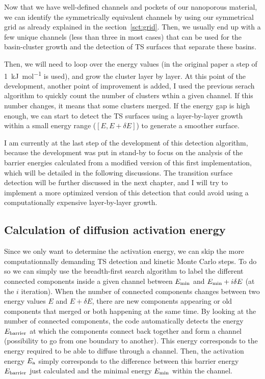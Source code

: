 \documentclass[main]{subfiles}
\begin{document}
Now that we have well-defined channels and pockets of our nanoporous material, we can identify the symmetrically equivalent channels by using our symmetrical grid as already explained in the section~\ref{sct:grid}. Then, we usually end up with a few unique channels (less than three in most cases) that can be used for the basin-cluster growth and the detection of TS surfaces that separate these basins. 

Then, we will need to loop over the energy values (in the original paper a step of \SI{1}{\kJ\per\mole} is used), and grow the cluster layer by layer. At this point of the development, another point of improvement is added, I used the previous serach algorithm to quickly count the number of clusters wthin a given channel. If this number changes, it means that some clusters merged. If the energy gap is high enough, we can start to detect the TS surfaces using a layer-by-layer growth within a small energy range ($[E,E+\delta E]$) to generate a smoother surface. 

I am currently at the last step of the development of this detection algorithm, because the development was put in stand-by to focus on the analysis of the barrier energies calculated from a modified version of this first implementation, which will be detailed in the following discussions. The transition surface detection will be further discussed in the next chapter, and I will try to implement a more optimized version of this detection that could avoid using a computationally expensive layer-by-layer growth. 

\subsection{Calculation of diffusion activation energy}

Since we only want to determine the activation energy, we can skip the more computationnally demanding TS detection and kinetic Monte Carlo steps. To do so we can simply use the breadth-first search algorithm to label the different connected components inside a given channel between $E_{\text{min}}$ and $E_{\text{min}}+i\delta E$ (at the $i$ iteration). When the number of connected components changes between two energy values $E$ and $E+\delta E$, there are new components appearing or old components that merged or both happening at the same time. By looking at the number of connected components, the code automatically detects the energy $E_{\text{barrier}}$ at which the components connect back together and form a channel (possibility to go from one boundary to another). This energy corresponds to the energy required to be able to diffuse through a channel. Then, the activation energy $E_{\text{a}}$ simply corresponds to the difference between this barrier energy $E_{\text{barrier}}$ just calculated and the minimal energy $E_{\text{min}}$ within the channel. 
\end{document}
